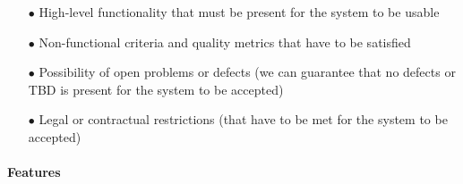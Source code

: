 \begin{itemize}
    \item[$\bullet$] High-level functionality that must be present for the system to be usable
    \item[$\bullet$] Non-functional criteria and quality metrics that have to be satisfied
    \item[$\bullet$] Possibility of open problems or defects (we can guarantee that no defects or TBD is present for the system to be accepted)
    \item[$\bullet$] Legal or contractual restrictions (that have to be met for the system to be accepted)
\end{itemize}

\paragraph{Features}

